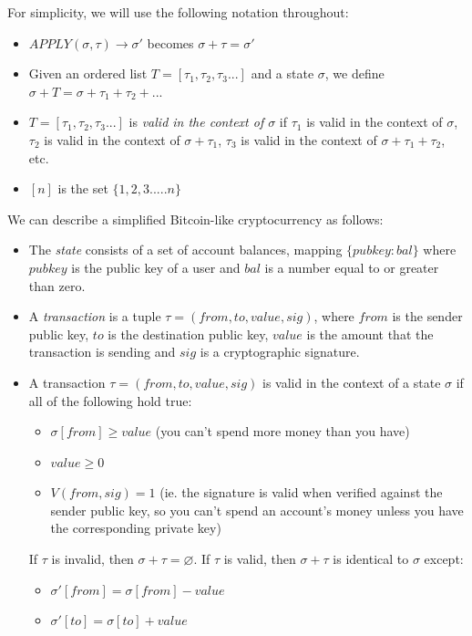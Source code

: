 \documentclass[11pt,a4paper]{article}
\theoremstyle{plain}
\theoremstyle{definition}
\theoremstyle{remark}
\begin{document}
For simplicity, we will use the following notation throughout:

\begin{itemize}
\item
$APPLY(\sigma, \tau) \rightarrow \sigma'$ becomes $\sigma + \tau = \sigma'$
\item  
Given an ordered list $T = [\tau_1, \tau_2, \tau_3...]$ and a state $\sigma$, we define $\sigma + T = \sigma + \tau_1 + \tau_2 + ...$
\item
$T = [\tau_1, \tau_2, \tau_3 ...]$ is \emph{valid in the context of $\sigma$} if $\tau_1$ is valid in the context of $\sigma$, $\tau_2$ is valid in the context of $\sigma + \tau_1$, $\tau_3$ is valid in the context of $\sigma + \tau_1 + \tau_2$, etc.
\item
$[n]$ is the set $\{1, 2, 3..... n\}$
\end{itemize}

We can describe a simplified Bitcoin-like cryptocurrency as follows:

\begin{itemize}
\item
The \emph{state} consists of a set of account balances, mapping $\{pubkey: bal\}$ where $pubkey$ is the public key of a user and $bal$ is a number equal to or greater than zero.
\item
A \emph{transaction} is a tuple $\tau = (from, to, value, sig)$, where $from$ is the sender public key, $to$ is the destination public key, $value$ is the amount that the transaction is sending and $sig$ is a cryptographic signature.
\item
A transaction $\tau = (from, to, value, sig)$ is valid in the context of a state $\sigma$ if all of the following hold true:
    \begin{itemize}
    \item
    $\sigma[from] \ge value$ (you can't spend more money than you have)
    \item
    $value \ge 0$
    \item
    $V(from, sig) = 1$ (ie. the signature is valid when verified against the sender public key, so you can't spend an account's money unless you have the corresponding private key)
    \end{itemize}
If $\tau$ is invalid, then $\sigma + \tau = \varnothing$. If $\tau$ is valid, then $\sigma + \tau$ is identical to $\sigma$ except:
    \begin{itemize}
    \item
    $\sigma'[from] = \sigma[from] - value$
    \item
    $\sigma'[to] = \sigma[to] + value$
    \end{itemize}
\end{itemize}
\end{document}
